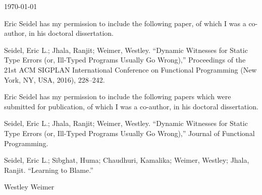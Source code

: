 \documentclass{article}
\begin{document}
\today

Eric Seidel has my permission to include the following paper, of which
I was a co-author, in his doctoral dissertation.

Seidel, Eric L.; Jhala, Ranjit; Weimer, Westley. ``Dynamic Witnesses for Static Type Errors (or, Ill-Typed Programs Usually Go Wrong),'' Proceedings of the 21st ACM SIGPLAN International Conference on Functional Programming (New York, NY, USA, 2016), 228--242.

Eric Seidel has my permission to include the following papers which were
submitted for publication, of which I was a co-author, in his doctoral
dissertation.

Seidel, Eric L.; Jhala, Ranjit; Weimer, Westley. ``Dynamic Witnesses for Static Type Errors (or, Ill-Typed Programs Usually Go Wrong),'' Journal of Functional Programming.

Seidel, Eric L.; Sibghat, Huma; Chaudhuri, Kamalika; Weimer, Westley; Jhala, Ranjit. ``Learning to Blame.''

\baselineskip
Westley Weimer
\end{document}
